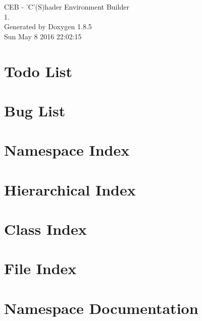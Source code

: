 \documentclass[twoside]{book}
\newcommand{\clearemptydoublepage}{%
  \newpage{\pagestyle{empty}\cleardoublepage}%
}
\begin{document}
\begin{titlepage}
\vspace*{7cm}
\begin{center}%
{\Large C\-E\-B -\/ 'C'(S)hader Environment Builder \\[1ex]\large 1. }\\
\vspace*{1cm}
{\large Generated by Doxygen 1.8.5}\\
\vspace*{0.5cm}
{\small Sun May 8 2016 22:02:15}\\
\end{center}
\end{titlepage}
\clearemptydoublepage
\tableofcontents
\clearemptydoublepage
{}

\chapter{Todo List}
\label{todo}

\chapter{Bug List}
\label{bug}

\chapter{Namespace Index}

\chapter{Hierarchical Index}

\chapter{Class Index}

\chapter{File Index}

\chapter{Namespace Documentation}



\end{document}
